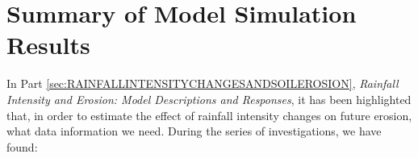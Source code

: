 
\section{Summary of Model Simulation Results}
\label{sec:SummaryOftheSimulationResults}


In Part \ref{sec:RAINFALLINTENSITYCHANGESANDSOILEROSION}, \textit{Rainfall
Intensity and Erosion: Model Descriptions and Responses}, it has
been highlighted that, in order to estimate the effect of rainfall intensity
changes on future erosion, what data information we need. During the series
of investigations, we have found:
